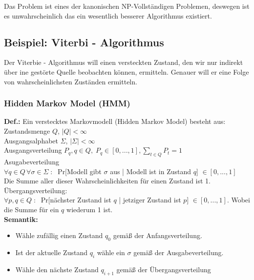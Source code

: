 Das Problem ist eines der kanonischen NP-Vollständigen Problemen, deswegen ist es unwahrscheinlich das ein wesentlich besserer Algorithmus existiert.

\subsection{Beispiel: Viterbi - Algorithmus}

Der Viterbie - Algorithmus will einen versteckten Zustand, den wir nur indirekt über ine gestörte Quelle beobachten können, ermitteln. Genauer will er eine Folge von wahrscheinlichsten Zuständen ermitteln.

\subsubsection{Hidden Markov Model (HMM)}

\textbf{Def.:} Ein verstecktes Markovmodell (Hidden Markov Model) besteht aus:\\

Zustandsmenge $Q$, $|Q| < \infty$\\
Ausgangsalphabet $\Sigma$, $| \Sigma | < \infty$\\
Ausgangsverteilung $P_q, q \in Q, \; P_q \in [0,...,1], \underset{t\in Q}{\sum} P_t = 1$\\
Asugabeverteilung \\
$\forall q \in Q \, \forall \sigma \in \Sigma \; : \;$ Pr[Modell gibt $\sigma$ aus | Modell ist in Zustand $q$] $\in [0,...,1]$\\
Die Summe aller dieser Wahrscheinlichkeiten für einen Zustand ist 1.\\
Übergangsverteilung:\\
$\forall p,q \in Q \; : \; $ Pr[nächster Zustand ist $q$ | jetziger Zustand ist $p$] $\in [0,..., 1]$. Wobei die Summe für ein $q$ wiederum 1 ist.\\

\textbf{Semantik:} 
\begin{itemize}

\item Wähle zufällig einen Zustand $q_0$ gemäß der Anfangsverteilung.

\item Ist der aktuelle Zustand $q_i$ wähle ein $\sigma$ gemäß der Ausgabeverteilung.

\item Wähle den nächste Zustand $q_{i+1}$ gemäß der Übergangsverteilung

\end{itemize}

